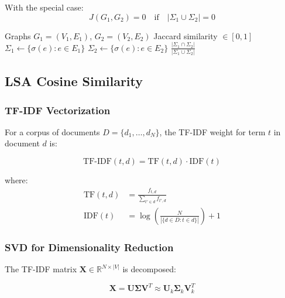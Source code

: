 \documentclass[11pt,a4paper]{article}
\begin{document}
With the special case:
\begin{equation}
J(G_1, G_2) = 0 \quad \text{if} \quad |\Sigma_1 \cup \Sigma_2| = 0
\end{equation}

\begin{algorithm}[H]
\caption{Jaccard Edge Similarity}
\begin{algorithmic}[1]
\Require Graphs $G_1 = (V_1, E_1)$, $G_2 = (V_2, E_2)$
\Ensure Jaccard similarity $\in [0, 1]$
\State $\Sigma_1 \gets \{\sigma(e) : e \in E_1\}$
\State $\Sigma_2 \gets \{\sigma(e) : e \in E_2\}$
    \State {}
\EndIf
\State \Return $\frac{|\Sigma_1 \cap \Sigma_2|}{|\Sigma_1 \cup \Sigma_2|}$
\end{algorithmic}
\end{algorithm}

\subsection{LSA Cosine Similarity}

\subsubsection{TF-IDF Vectorization}

For a corpus of documents $D = \{d_1, \ldots, d_N\}$, the TF-IDF weight for term $t$ in document $d$ is:

\begin{equation}
\text{TF-IDF}(t, d) = \text{TF}(t, d) \cdot \text{IDF}(t)
\end{equation}

where:
\begin{align}
\text{TF}(t, d) &= \frac{f_{t,d}}{\sum_{t' \in d} f_{t',d}} \\
\text{IDF}(t) &= \log\left(\frac{N}{|\{d \in D : t \in d\}|}\right) + 1
\end{align}

\subsubsection{SVD for Dimensionality Reduction}

The TF-IDF matrix $\mathbf{X} \in \mathbb{R}^{N \times |V|}$ is decomposed:

\begin{equation}
\mathbf{X} = \mathbf{U} \boldsymbol{\Sigma} \mathbf{V}^T \approx \mathbf{U}_k \boldsymbol{\Sigma}_k \mathbf{V}_k^T
\end{equation}
\end{document}
